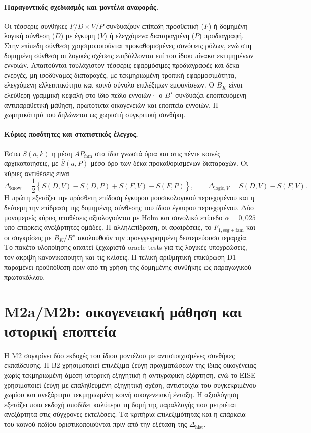 \documentclass[11pt,a4paper]{article}
\begin{document}
\paragraph{Παραγοντικός σχεδιασμός και μοντέλα αναφοράς.}
Οι τέσσερις συνθήκες $F/D\times V/P$ συνδυάζουν επίπεδη προσθετική ($F$) ή δομημένη λογική σύνθεση ($D$) με έγκυρη ($V$) ή ελεγχόμενα διαταραγμένη ($P$) προδιαγραφή. Στην επίπεδη σύνθεση χρησιμοποιούνται προκαθορισμένες συνόψεις ρόλων, ενώ στη δομημένη σύνθεση οι λογικές σχέσεις επιβάλλονται επί του ίδιου πίνακα εκτιμημένων εννοιών. Απαιτούνται τουλάχιστον τέσσερις εφαρμόσιμες προδιαγραφές και δέκα ενεργές, μη ισοδύναμες διαταραχές, με τεκμηριωμένη τροπική εφαρμοσιμότητα, ελεγχόμενη ελλειπτικότητα και κοινό σύνολο επιλέξιμων εμφανίσεων. Ο $B_K$ είναι ελεύθερη γραμμική κεφαλή στο ίδιο πεδίο εννοιών· ο $B^\star$ συνδυάζει εποπτευόμενη αντιπαραθετική μάθηση, πρωτότυπα οικογενειών και εποπτεία εννοιών. Η χωρητικότητά του δηλώνεται ως χωριστή συγκριτική συνθήκη.

\paragraph{Κύριες ποσότητες και στατιστικός έλεγχος.}
Έστω $S(a,k)$ η μέση $AP_{\mathrm{fam}}$ στα ίδια γνωστά όρια και στις πέντε κοινές αρχικοποιήσεις, με $\overline S(a,P)$ μέσο όρο των δέκα προκαθορισμένων διαταραχών. Οι κύριες αντιθέσεις είναι
\[
\Delta_{\mathrm{know}}=\frac{1}{2}\left\{S(D,V)-\overline S(D,P)+S(F,V)-\overline S(F,P)\right\},
\qquad
\Delta_{\mathrm{logic},V}=S(D,V)-S(F,V).
\]
Η πρώτη εξετάζει την πρόσθετη επίδοση έγκυρου μουσικολογικού περιεχομένου και η δεύτερη την επίδραση της δομημένης σύνθεσης του ίδιου έγκυρου περιεχομένου. Δύο μονομερείς κύριες υποθέσεις αξιολογούνται με Holm και συνολικό επίπεδο $\alpha=0{,}025$ υπό επαρκείς ανεξάρτητες ομάδες. Η αλληλεπίδραση, οι αφαιρέσεις, το $F_{1,\mathrm{seg+fam}}$ και οι συγκρίσεις με $B_K/B^\star$ ακολουθούν την προεγγεγραμμένη δευτερεύουσα ιεραρχία. Το πακέτο υλοποίησης απαιτεί ξεχωριστά oracle tests για τις λογικές υποχρεώσεις, τον ακριβή κανονικοποιητή και τις κλίσεις. Η τελική αριθμητική επικύρωση D1 παραμένει προϋπόθεση πριν από τη χρήση της δομημένης συνθήκης ως παραγωγικού πρωτοκόλλου.

\section{Μ2a/Μ2b: οικογενειακή μάθηση και ιστορική εποπτεία}\label{sec:eise}

Η M2 συγκρίνει δύο εκδοχές του ίδιου μοντέλου με αντιστοιχισμένες συνθήκες εκπαίδευσης. Η B2 χρησιμοποιεί επιλέξιμα ζεύγη πραγματώσεων της ίδιας οικογένειας χωρίς τεκμηριωμένη άμεση ιστορική εξηγητική ή αντιγραφική εξάρτηση, ενώ το EISE χρησιμοποιεί ζεύγη με επαληθευμένη εξηγητική σχέση, αντιστοιχία του συγκεκριμένου χωρίου και ανεξάρτητα τεκμηριωμένη κοινή οικογενειακή ένταξη. Η αξιολόγηση εξετάζει ποια εκδοχή αποδίδει καλύτερα τη δομή της παραλλαγής που μετριέται ανεξάρτητα στις σύγχρονες εκτελέσεις. Τα κριτήρια επιλεξιμότητας και η επάρκεια του κοινού πεδίου οριστικοποιούνται πριν από την εξέταση της $\Delta_{\mathrm{hist}}$.
\end{document}
